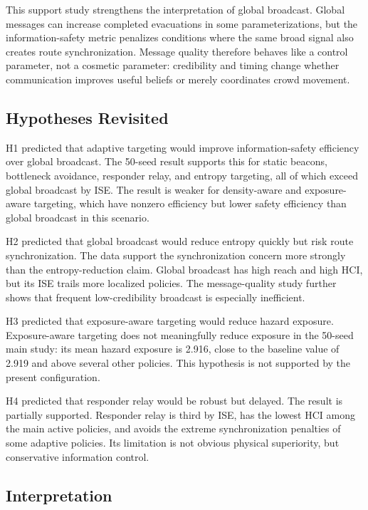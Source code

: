 This support study strengthens the interpretation of global broadcast. Global
messages can increase completed evacuations in some parameterizations, but the
information-safety metric penalizes conditions where the same broad signal also
creates route synchronization. Message quality therefore behaves like a control
parameter, not a cosmetic parameter: credibility and timing change whether
communication improves useful beliefs or merely coordinates crowd movement.

\subsection{Hypotheses Revisited}
\label{subsec:hypotheses-results}

H1 predicted that adaptive targeting would improve information-safety
efficiency over global broadcast. The 50-seed result supports this for static
beacons, bottleneck avoidance, responder relay, and entropy targeting, all of
which exceed global broadcast by ISE. The result is weaker for density-aware
and exposure-aware targeting, which have nonzero efficiency but lower safety
efficiency than global broadcast in this scenario.

H2 predicted that global broadcast would reduce entropy quickly but risk route
synchronization. The data support the synchronization concern more strongly
than the entropy-reduction claim. Global broadcast has high reach and high HCI,
but its ISE trails more localized policies. The message-quality study further
shows that frequent low-credibility broadcast is especially inefficient.

H3 predicted that exposure-aware targeting would reduce hazard exposure.
Exposure-aware targeting does not meaningfully reduce exposure in the 50-seed
main study: its mean hazard exposure is 2.916, close to the baseline value of
2.919 and above several other policies. This hypothesis is not supported by
the present configuration.

H4 predicted that responder relay would be robust but delayed. The result is
partially supported. Responder relay is third by ISE, has the lowest HCI among
the main active policies, and avoids the extreme synchronization penalties of
some adaptive policies. Its limitation is not obvious physical superiority, but
conservative information control.

\subsection{Interpretation}
\label{subsec:interpretation}

